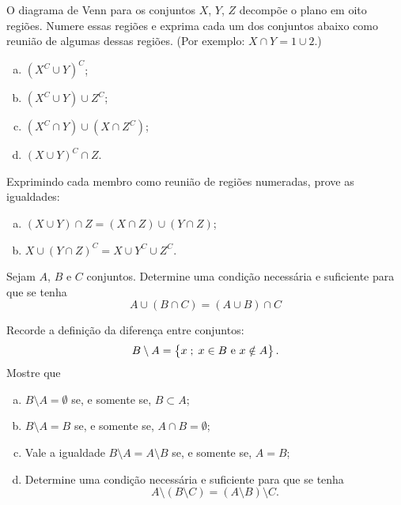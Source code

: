 \begin{exercise}
O diagrama de Venn para os conjuntos $X$, $Y$, $Z$ decompõe o
plano em oito regiões. Numere essas regiões e exprima cada um dos
conjuntos abaixo como reunião de algumas dessas regiões. (Por
exemplo: $X \cap Y = 1 \cup 2$.)
\begin{enumerate}[a.]
  \item $\left(X^C \cup Y \right)^C$;
  \item $\left(X^C \cup Y \right) \cup Z^C$;
  \item $\left(X^C \cap Y \right) \cup \left(X \cap Z^C \right)$;
  \item $\left(X \cup Y \right)^C \cap Z$.
\end{enumerate}
\end{exercise}

\begin{exercise}
Exprimindo cada membro como reunião de regiões numeradas, prove
as igualdades:
\begin{enumerate}[a.]
  \item $\left(X \cup Y \right)\cap Z = \left(X \cap Z \right) \cup \left(Y \cap Z
  \right)$;
  \item $X \cup \left(Y \cap Z \right)^C = X \cup Y^C \cup Z^C$.
\end{enumerate}
\end{exercise}

\begin{exercise}
Sejam $A$, $B$ e $C$ conjuntos. Determine uma condição necessária e
suficiente para que se tenha 
	$$A \cup \left( B \cap C \right) = \left(A \cup B \right) \cap C$$
\end{exercise}

\begin{exercise}
Recorde a definição da diferença entre conjuntos:
  $$B \setminus A = \left\{ x \;;\; x \in B \text { e } x \notin A\right\}.$$
  Mostre que
    \begin{enumerate}[a.]
      \item $B \setminus A = \emptyset$ se, e somente se, $B \subset
      A$;
      \item $B \setminus A = B$ se, e somente se, $A \cap B =
      \emptyset$;
      \item Vale a igualdade $B \setminus A = A \setminus B$ se, e
      somente se, $A = B$;
      \item Determine uma condição necessária e suficiente para que
      se tenha $$A \setminus \left(B \setminus C \right) = \left(A
      \setminus B \right) \setminus C.$$
    \end{enumerate}
\end{exercise}

